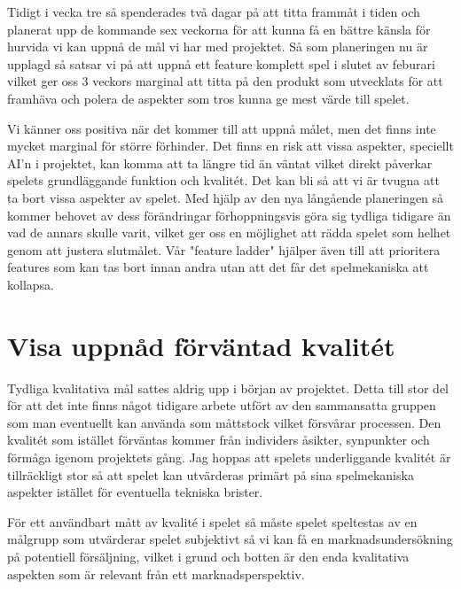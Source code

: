 \documentclass[a4paper]{report}
\begin{document}
Tidigt i vecka tre så spenderades två dagar på att titta frammåt i tiden och
planerat upp de kommande sex veckorna för att kunna få en bättre känsla för
hurvida vi kan uppnå de mål vi har med projektet. Så som planeringen nu är
upplagd så satsar vi på att uppnå ett feature komplett spel i slutet av
feburari vilket ger oss 3 veckors marginal att titta på den produkt som
utvecklats för att framhäva och polera de aspekter som tros kunna ge mest
värde till spelet.

Vi känner oss positiva när det kommer till att uppnå målet, men det finns inte
mycket marginal för större förhinder. Det finns en risk att vissa aspekter,
speciellt AI'n i projektet, kan komma att ta längre tid än väntat vilket direkt
påverkar spelets grundläggande funktion och kvalitét. Det kan bli så att vi är
tvugna att ta bort vissa aspekter av spelet. Med hjälp av den nya långående
planeringen så kommer behovet av dess förändringar förhoppningsvis göra sig
tydliga tidigare än vad de annars skulle varit, vilket ger oss en möjlighet att
rädda spelet som helhet genom att justera slutmålet. Vår "feature ladder"
hjälper även till att prioritera features som kan tas bort innan andra utan
att det får det spelmekaniska att kollapsa.

\section*{Visa uppnåd förväntad kvalitét}

Tydliga kvalitativa mål sattes aldrig upp i början av projektet. Detta till
stor del för att det inte finns något tidigare arbete utfört av den sammansatta
gruppen som man eventuellt kan använda som måttstock vilket försvårar
processen. Den kvalitét som istället förväntas kommer från individers åsikter,
synpunkter och förmåga igenom projektets gång. Jag hoppas att spelets
underliggande kvalitét är tillräckligt stor så att spelet kan utvärderas
primärt på sina spelmekaniska aspekter istället för eventuella tekniska
brister.

För ett användbart mått av kvalité i spelet så måste spelet speltestas av en
målgrupp som utvärderar spelet subjektivt så vi kan få en marknadsundersökning
på potentiell försäljning, vilket i grund och botten är den enda kvalitativa
aspekten som är relevant från ett marknadsperspektiv.
\end{document}
